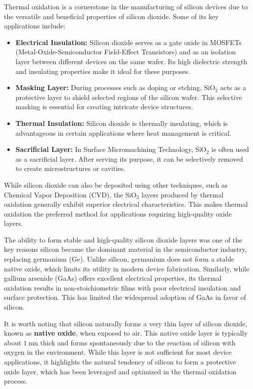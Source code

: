 \documentclass{report}
\begin{document}
Thermal oxidation is a cornerstone in the manufacturing of silicon devices due to the versatile and beneficial properties of silicon dioxide. Some of its key applications include:

\begin{itemize}
    \item \textbf{Electrical Insulation:} Silicon dioxide serves as a gate oxide in MOSFETs (Metal-Oxide-Semiconductor Field-Effect Transistors) and as an isolation layer between different devices on the same wafer. Its high dielectric strength and insulating properties make it ideal for these purposes.
    \item \textbf{Masking Layer:} During processes such as doping or etching, $\text{SiO}_{2}$ acts as a protective layer to shield selected regions of the silicon wafer. This selective masking is essential for creating intricate device structures.
    \item \textbf{Thermal Insulation:} Silicon dioxide is thermally insulating, which is advantageous in certain applications where heat management is critical.
    \item \textbf{Sacrificial Layer:} In Surface Micromachining Technology, $\text{SiO}_{2}$ is often used as a sacrificial layer. After serving its purpose, it can be selectively removed to create microstructures or cavities.
\end{itemize}

While silicon dioxide can also be deposited using other techniques, such as Chemical Vapor Deposition (CVD), the $\text{SiO}_{2}$ layers produced by thermal oxidation generally exhibit superior electrical characteristics. This makes thermal oxidation the preferred method for applications requiring high-quality oxide layers.

The ability to form stable and high-quality silicon dioxide layers was one of the key reasons silicon became the dominant material in the semiconductor industry, replacing germanium (Ge). Unlike silicon, germanium does not form a stable native oxide, which limits its utility in modern device fabrication. Similarly, while gallium arsenide (GaAs) offers excellent electrical properties, its thermal oxidation results in non-stoichiometric films with poor electrical insulation and surface protection. This has limited the widespread adoption of GaAs in favor of silicon.

It is worth noting that silicon naturally forms a very thin layer of silicon dioxide, known as \textbf{native oxide}, when exposed to air. This native oxide layer is typically about $1~\text{nm}$ thick and forms spontaneously due to the reaction of silicon with oxygen in the environment. While this layer is not sufficient for most device applications, it highlights the natural tendency of silicon to form a protective oxide layer, which has been leveraged and optimized in the thermal oxidation process.
\end{document}
